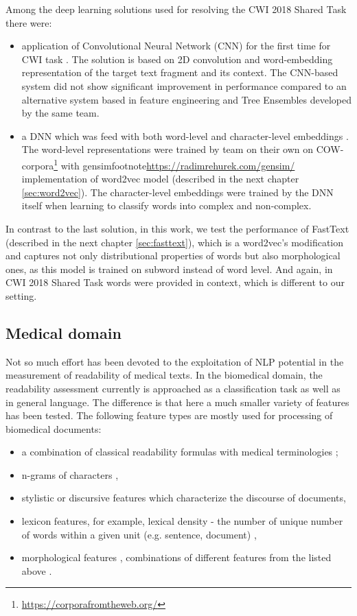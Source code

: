 Among the deep learning solutions used for resolving the CWI 2018 Shared Task  there were:
\begin{itemize}
    \item application of Convolutional Neural Network (CNN) for the first time for CWI task \citep{Aroyehun-BEA2018}. The solution is based on 2D convolution and word-embedding representation of the target text fragment and its context. The CNN-based system did not show significant improvement in performance compared to an alternative system based in feature engineering and Tree Ensembles developed by the same team. 
    
    \item a DNN which was feed with both word-level and character-level embeddings \citep{DeHertog-ACL2018}. The word-level representations were trained by team on their own on COW-corpora\footnote{\url{https://corporafromtheweb.org/}} with gensimfootnote{\url{https://radimrehurek.com/gensim/}} implementation of word2vec model (described in the next chapter \ref{sec:word2vec}). The character-level embeddings were trained by the DNN itself when learning to classify words into complex and non-complex.
\end{itemize}

In contrast to the last solution, in this work, we test the performance of FastText (described in the next chapter \ref{sec:fasttext}), which is a word2vec's modification and captures not only distributional properties of words but also morphological ones, as this model is trained on subword instead of word level. And again, in  CWI 2018 Shared Task words were provided in context, which is different to our setting.


\subsection{Medical domain}
Not so much effort has been devoted to the exploitation of NLP potential in the measurement of readability of medical texts.
In the biomedical domain, the readability assessment currently is approached as a classification task as well as in general language. The difference is that here a much smaller variety of features has been tested. The following feature types are mostly used for processing of biomedical documents:
\begin{itemize}
    \item a combination of classical readability formulas
with medical terminologies \citep{Kokkinakis-2006};
    \item n-grams of characters \citep{Poprat-MIE2006}, 
    \item stylistic \citep{Grabar-AMIA2007} or discursive \citep{Goeuriot-LREC2008} features which characterize the discourse of documents,
    \item lexicon features, for example, lexical density - the number of unique number of words within a given unit (e.g. sentence, document) \citep{Miller-HICSS2007},
    \item morphological features \citep{Chmielik-TAL2011},
    \items combinations of different features from the listed above
    \citep{Zeng-MEDINFO2007}.
\end{itemize}

